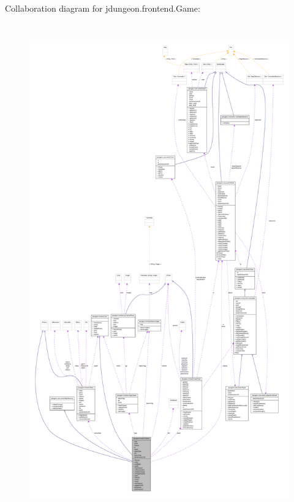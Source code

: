 Collaboration diagram for jdungeon.frontend.Game:
\nopagebreak
\begin{figure}[H]
\begin{center}
\leavevmode
\includegraphics[height=600pt]{classjdungeon_1_1frontend_1_1_game__coll__graph}
\end{center}
\end{figure}
